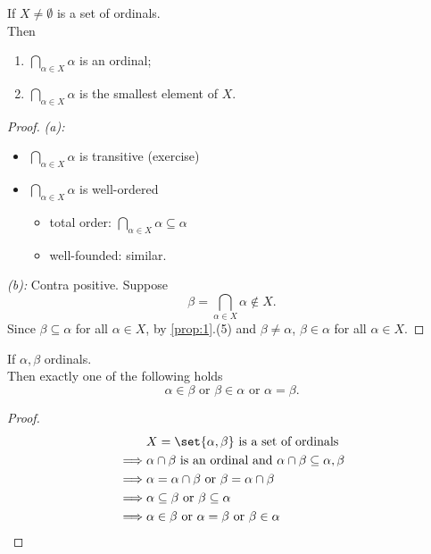 \begin{proposition}
    If $X \ne \emptyset$ is a set of ordinals.\\
    Then 
    \begin{enumerate}[label=(\alph*)]
        \item $\bigcap_{\alpha \in X} \alpha$ is an ordinal;
        \item $\bigcap_{\alpha \in X} \alpha$ is the smallest element of $X$.
    \end{enumerate}
\end{proposition}
\begin{proof} \emph{(a):}
    \begin{itemize}[label=-]
        \item $\bigcap_{\alpha \in X} \alpha$ is transitive (exercise)
        \item $\bigcap_{\alpha \in X} \alpha$ is well-ordered
         \begin{itemize}[label=-]
             \item total order: $\bigcap_{\alpha \in X} \alpha \subseteq \alpha$
             \item well-founded: similar.
         \end{itemize}
    \end{itemize}
    \emph{(b):} Contra positive. Suppose 
    $$ \beta = \bigcap_{\alpha \in X} \alpha \notin X. $$
    Since $\beta \subseteq \alpha$ for all $\alpha \in X$, by \cref{prop:1}.(5) and $\beta \ne \alpha$, $\beta \in \alpha$ for all $\alpha \in X$.
\end{proof}

\begin{theorem}
    If $\alpha, \beta$ ordinals.\\
    Then exactly one of the following holds
    $$\alpha \in \beta \text{ or } \beta \in \alpha \text{ or } \alpha = \beta.$$
\end{theorem}
\begin{proof}
    \begin{align*}
        & X = \set{\alpha, \beta} \text{ is a set of ordinals}\\
        \implies & \alpha \cap \beta \text{ is an ordinal and } \alpha \cap \beta \subseteq \alpha, \beta\\
        \implies & \alpha = \alpha \cap \beta \text{ or } \beta = \alpha \cap \beta\\
        \implies & \alpha \subseteq \beta \text{ or } \beta \subseteq \alpha\\
        \implies & \alpha \in \beta \text{ or } \alpha = \beta \text{ or } \beta \in \alpha
    \end{align*}
\end{proof}

